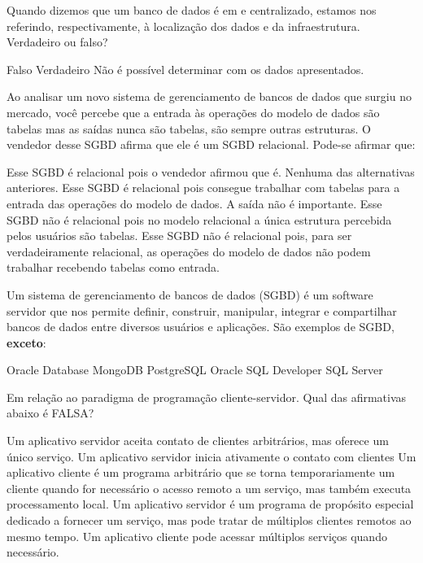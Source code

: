 \documentclass[12pt, addpoints]{exam}
\begin{document}
    \begin{questions}

    \newpage
    \question
Quando dizemos que um banco de dados é em  e centralizado, estamos
nos referindo, respectivamente, à localização dos dados e da
infraestrutura. Verdadeiro ou falso?
\begin{choices}
\choice Falso
\choice Verdadeiro
\choice Não é possível determinar com os dados apresentados.
\end{choices}

\question
Ao analisar um novo sistema de gerenciamento de bancos de dados que surgiu no
mercado, você percebe que a entrada às operações do modelo de dados são tabelas
mas as saídas nunca são tabelas, são sempre outras estruturas. O vendedor desse
SGBD afirma que ele é um SGBD relacional. Pode-se afirmar que:

\begin{choices}
\choice Esse SGBD é relacional pois o vendedor afirmou que é.
\choice Nenhuma das alternativas anteriores.
\choice Esse SGBD é relacional pois consegue trabalhar com tabelas para a entrada das operações do modelo de dados. A saída não é importante.
\choice Esse SGBD não é relacional pois no modelo relacional a única estrutura percebida pelos usuários são tabelas.
\choice Esse SGBD não é relacional pois, para ser verdadeiramente relacional, as operações do modelo de dados não podem trabalhar recebendo tabelas como entrada.
\end{choices}

\question
Um sistema de gerenciamento de bancos de dados (SGBD) é um software servidor
que nos permite definir, construir, manipular, integrar e compartilhar bancos
de dados entre diversos usuários e aplicações. São exemplos de
SGBD, \textbf{exceto}:
\begin{choices}
\choice Oracle Database
\choice MongoDB
\choice PostgreSQL
\choice Oracle SQL Developer
\choice SQL Server
\end{choices}

\question
Em relação ao paradigma de programação cliente-servidor. Qual das afirmativas abaixo é FALSA?
\begin{choices}
\choice Um aplicativo servidor aceita contato de clientes arbitrários, mas oferece um único serviço. 
\choice Um aplicativo servidor inicia ativamente o contato com clientes 
\choice Um aplicativo cliente é um programa arbitrário que se torna temporariamente um cliente quando for necessário o acesso remoto a um serviço, mas também executa processamento local.
\choice Um aplicativo servidor é um programa de propósito especial dedicado a fornecer um serviço, mas pode tratar de múltiplos clientes remotos ao mesmo tempo. 
\choice Um aplicativo cliente pode acessar múltiplos serviços quando necessário.
\end{choices}


\end{questions}
\end{document}
